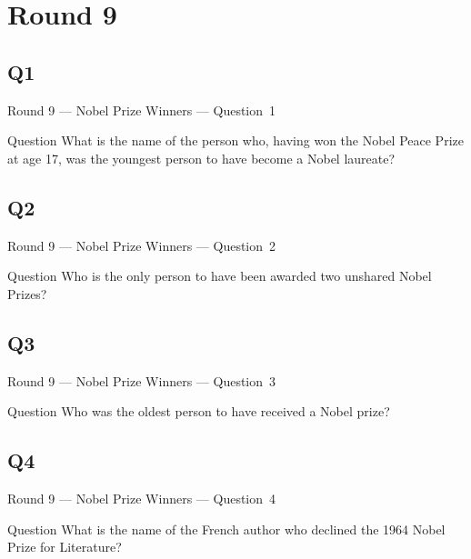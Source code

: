 \documentclass[11pt,draft]{beamer}
\begin{document}
\section{Round 9}
\subsection*{Q1}
\begin{frame}[t]{Round 9 --- Nobel Prize Winners --- \mbox{Question 1}}
    \begin{block}{Question}
        What is the name of the person who, having won the Nobel Peace Prize at age 17, was the youngest person to have become a Nobel laureate?
    \end{block}
\end{frame}
\subsection*{Q2}
\begin{frame}[t]{Round 9 --- Nobel Prize Winners --- \mbox{Question 2}}
    \begin{block}{Question}
        Who is the only person to have been awarded two unshared Nobel Prizes?
    \end{block}
\end{frame}
\subsection*{Q3}
\begin{frame}[t]{Round 9 --- Nobel Prize Winners --- \mbox{Question 3}}
    \begin{block}{Question}
        Who was the oldest person to have received a Nobel prize?
    \end{block}
\end{frame}
\subsection*{Q4}
\begin{frame}[t]{Round 9 --- Nobel Prize Winners --- \mbox{Question 4}}
    \begin{block}{Question}
        What is the name of the French author who declined the 1964 Nobel Prize for Literature?
    \end{block}
\end{frame}
\end{document}
